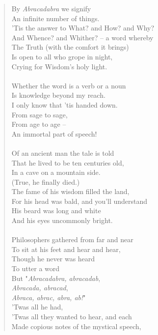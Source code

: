 \documentclass[11pt]{article}
\begin{document}
\begin{quote}   By {\em Abracadabra} we signify \\
      An infinite number of things. \\
  'Tis the answer to What? and How? and Why? \\
  And Whence? and Whither? -- a word whereby \\
      The Truth (with the comfort it brings) \\
  Is open to all who grope in night, \\
  Crying for Wisdom's holy light. \\
 \\
  Whether the word is a verb or a noun \\
      Is knowledge beyond my reach. \\
  I only know that 'tis handed down. \\
          From sage to sage, \\
          From age to age -- \\
      An immortal part of speech! \\
 \\
  Of an ancient man the tale is told \\
  That he lived to be ten centuries old, \\
      In a cave on a mountain side. \\
      (True, he finally died.) \\
  The fame of his wisdom filled the land, \\
  For his head was bald, and you'll understand \\
      His beard was long and white \\
      And his eyes uncommonly bright. \\
 \\
  Philosophers gathered from far and near \\
  To sit at his feet and hear and hear, \\
          Though he never was heard \\
          To utter a word \\
      But "{\em Abracadabra, abracadab}, \\
          {\em Abracada, abracad}, \\
      {\em Abraca, abrac, abra, ab!}" \\
          'Twas all he had, \\
  'Twas all they wanted to hear, and each \\
  Made copious notes of the mystical speech, \\

\end{quote}
\end{document}
